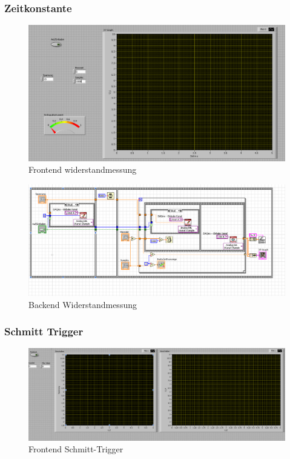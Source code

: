 \documentclass[12pt,twoside,a4paper]{scrartcl}
\begin{document}
		\subsubsection{Zeitkonstante}
			\label{Programme::Kondensator}

			\begin{figure}[H]
				\centering
				\includegraphics[width = 0.9 \textwidth]{Pictures/Programme/Frontend_Capacitor}
				\caption{Frontend widerstandmessung}
			\end{figure}

				\begin{figure}[H]
					\centering
					\includegraphics[width = 0.9 \textwidth]{Pictures/Programme/Backend_Capacitor}
					\caption{Backend Widerstandmessung}
				\end{figure}

		\subsubsection{Schmitt Trigger}
			\label{Programme::Schmitt}
			\begin{figure}[H]
				\centering
				\includegraphics[width = 0.9 \textwidth]{Pictures/Programme/Frontend_Schmitt}
				\caption{Frontend Schmitt-Trigger}
			\end{figure}
\end{document}
